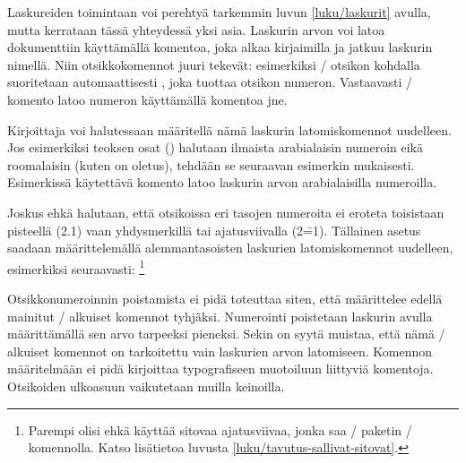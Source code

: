 Laskureiden toimintaan voi perehtyä tarkemmin luvun \ref{luku/laskurit}
avulla, mutta kerrataan tässä yhteydessä yksi asia. Laskurin arvon voi
latoa dokumenttiin käyttämällä komentoa, joka alkaa kirjaimilla
 ja jatkuu laskurin nimellä. Niin otsikkokomennot juuri
tekevät: esimerkiksi \-/ otsikon kohdalla suoritetaan
automaattisesti , joka tuottaa otsikon numeron.
Vastaavasti \-/ komento latoo numeron käyttämällä
komentoa  jne.

Kirjoittaja voi halutessaan määritellä nämä laskurin latomiskomennot
uudelleen. Jos esimerkiksi teoksen osat () halutaan
ilmaista arabialaisin numeroin eikä roomalaisin (kuten on oletus),
tehdään se seuraavan esimerkin mukaisesti. Esimerkissä käytettävä
komento  latoo laskurin arvon arabialaisilla numeroilla.

\begin{koodilohkosis}
\renewcommand{\thepart}{\arabic{part}}
\end{koodilohkosis}

\noindent
Joskus ehkä halutaan, että otsikoissa eri tasojen numeroita ei eroteta
toisistaan pisteellä (2.1) vaan yhdysmerkillä tai ajatusviivalla
(2\==1). Tällainen asetus saadaan määrittelemällä alemmantasoisten
laskurien latomiskomennot uudelleen, esimerkiksi seuraavasti:%
\footnote{Parempi olisi ehkä käyttää sitovaa ajatusviivaa, jonka saa
  \-/ paketin \komento{==}\-/ komennolla. Katso
  lisätietoa luvusta \ref{luku/tavutus-sallivat-sitovat}.}

\begin{koodilohkosis}
\renewcommand{\thesubsection}{\thesection--\arabic{subsection}}
\renewcommand{\thesubsubsection}{%
  \thesubsection--\arabic{subsubsection}}
\end{koodilohkosis}

\noindent
Otsikkonumeroinnin poistamista ei pidä toteuttaa siten, että määrittelee
edellä mainitut \-/ alkuiset komennot tyhjäksi. Numerointi
poistetaan laskurin  avulla määrittämällä sen arvo
tarpeeksi pieneksi. Sekin on syytä muistaa, että nämä \-/
alkuiset komennot on tarkoitettu vain laskurien arvon latomiseen.
Komennon määritelmään ei pidä kirjoittaa typografiseen muotoiluun
liittyviä komentoja. Otsikoiden ulkoasuun vaikutetaan muilla keinoilla.

